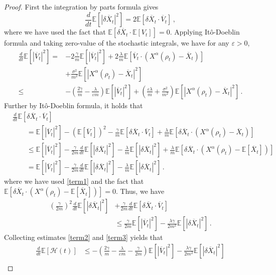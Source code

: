 \documentclass{ims9x6}
\newcommand{\nn}{\nonumber}
\newcommand{\EE}{\mathbb{E}}
\newcommand{\OV}{\overline{V}}
\newcommand{\OX}{\overline{X}}
\newcommand{\CH}{{\mathcal{H}}}
\begin{document}
\begin{proof}
	First the integration by parts formula gives
	\begin{equation}\label{term1}
	\frac{d}{dt} \EE[|\delta\OX_t|^2]=2\EE[\delta\OX_t\cdot \OV_t]\,,%
	\end{equation}
	where we have used the fact that $\EE[\delta\OX_t\cdot \EE[V_t]]=0$.
	Applying It\^{o}-Doeblin formula and taking zero-value of the stochastic integrals, we have for any $\varepsilon>0$,
	\begin{align}\label{term2}
	\frac{d}{dt} \EE[|\OV_t|^2] =& -2\frac{\gamma}{m}\EE[|\OV_t|^2]+2\frac{\lambda}{m}\EE[\OV_t\cdot(X^\alpha(\rho_t)-\OX_t)]\nn\\
	&+\frac{\sigma^2}{m^2}\EE[|X^\alpha(\rho_t)-\OX_t|^2] \nn \\
	\leq&-(\frac{2\gamma}{m}-\frac{\lambda}{\varepsilon m})\EE[|\OV_t|^2]+(\frac{\varepsilon\lambda}{ m}+\frac{\sigma^2}{m^2})\EE[|X^\alpha(\rho_t)-\OX_t|^2]
	\,.
	\end{align}
	Further by It\^{o}-Doeblin formula, it holds that
	\begin{align}\label{ito}
	&\frac{d}{dt}\EE[\delta\OX_t\cdot \OV_t]\nn\\
	&\qquad =\EE[|\OV_t|^2]-(\EE[\OV_t])^2-\frac{\gamma}{m}\EE[\delta\OX_t\cdot\OV_t]+\frac{\lambda}{m}\EE[\delta\OX_t\cdot(X^\alpha(\rho_t)-\OX_t)]\nn\\
	&\qquad \leq \EE[|\OV_t|^2] -\frac{\gamma}{2m}\frac{d}{dt} \EE[|\delta\OX_t|^2]-\frac{\lambda}{m}\EE[|\delta\OX_t|^2]+\frac{\lambda}{m}\EE[\delta\OX_t\cdot(X^\alpha(\rho_t)-\EE[\OX_t])]
	\nn\\
	&\qquad = \EE[|\OV_t|^2]-\frac{\gamma}{2m}\frac{d}{dt} \EE[|\delta\OX_t|^2]-\frac{\lambda}{m}\EE[|\delta\OX_t|^2]\,.
	\end{align}
	where we have used \eqref{term1} and the fact that $\EE[\delta\OX_t\cdot(X^\alpha(\rho_t)-\EE[\OX_t])]=0$. Thus, we have
	\begin{align}\label{term3}
	(\frac{\gamma}{2m})^2\frac{d}{dt} \EE[|\delta\OX_t|^2]&+\frac{\gamma}{2m}\frac{d}{dt}\EE[\delta\OX_t\cdot \OV_t] \nn \\
	& \leq \frac{\gamma}{2m}\EE[|\OV_t|^2]-\frac{\lambda\gamma}{2m^2}\EE[|\delta\OX_t|^2]\,.
	\end{align}
	Collecting estimates \eqref{term2} and \eqref{term3}  yields that
	\begin{align}
	\frac{d}{dt}\EE[\CH(t)]&\leq -\left(\frac{2\gamma}{m}-\frac{\lambda}{\varepsilon m}-\frac{\gamma}{2m}\right)\EE[|\OV_t|^2]-\frac{\lambda\gamma}{2m^2}\EE[|\delta\OX_t|^2] \nn\\

\end{align}
\end{proof}
\end{document}
